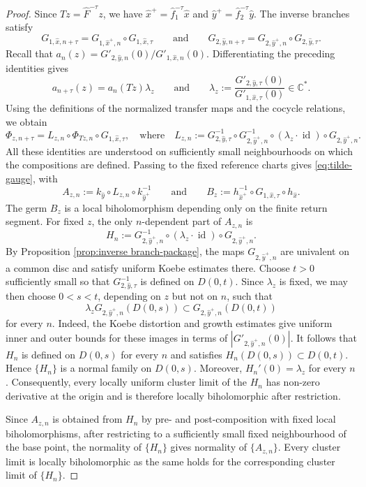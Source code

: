 \documentclass[11pt]{amsart}
\numberwithin{equation}{section}
\theoremstyle{plain}
\theoremstyle{definition}
\theoremstyle{remark}
\begin{document}
\begin{proof}
Since $Tz=\hat F^{-\tau}z$, we have
$\hat x^+=\hat f_1^{-\tau}\hat x$ and
$\hat y^+=\hat f_2^{-\tau}\hat y$. The inverse branches satisfy
$$
G_{1,\hat x,n+\tau}
=
G_{1,\hat x^+,n}\circ G_{1,\hat x,\tau}
\qquad
\text{and}
\qquad
G_{2,\hat y,n+\tau}
=
G_{2,\hat y^+,n}\circ G_{2,\hat y,\tau}.
$$
Recall that
$a_n(z)=G'_{2,\hat y,n}(0)/G'_{1,\hat x,n}(0)$. Differentiating the
preceding identities gives
$$
a_{n+\tau}(z)
=
a_n(Tz)\lambda_z
\qquad
\text{and}
\qquad
\lambda_z
:=
\frac{G'_{2,\hat y,\tau}(0)}
     {G'_{1,\hat x,\tau}(0)}
\in\mathbb C^*.
$$
Using the definitions of the normalized transfer maps and the cocycle
relations, we obtain
$$
\Phi_{z,n+\tau}
=
L_{z,n}\circ
\Phi_{Tz,n}\circ
G_{1,\hat x,\tau},
\quad \text{where}
\quad
L_{z,n}
:=
G_{2,\hat y,\tau}^{-1}
\circ
G_{2,\hat y^+,n}^{-1}
\circ
(\lambda_z\cdot\operatorname{id})
\circ
G_{2,\hat y^+,n}.
$$
All these identities are understood on sufficiently small
neighbourhoods on which the compositions are defined.
Passing to the fixed reference charts gives
\eqref{eq:tilde-gauge}, with
$$
A_{z,n}
:=
k_{\hat y}\circ L_{z,n}\circ k_{\hat y^+}^{-1}
\qquad
\text{and}
\qquad
B_z
:=
h_{\hat x^+}^{-1}\circ
G_{1,\hat x,\tau}\circ h_{\hat x}.
$$
The germ $B_z$ is a local biholomorphism depending only on the finite
return segment.
For fixed $z$, the only $n$-dependent part of $A_{z,n}$ is 
$$
H_n
:=
G_{2,\hat y^+,n}^{-1}
\circ
(\lambda_z\cdot\operatorname{id})
\circ
G_{2,\hat y^+,n}.
$$
By Proposition \ref{prop:inverse branch-package}, the maps
$G_{2,\hat y^+,n}$ are univalent on a common disc and satisfy uniform
Koebe estimates there. Choose $t>0$ sufficiently small so that
$G_{2,\hat y,\tau}^{-1}$ is defined on $D(0,t)$. Since $\lambda_z$
is fixed, we may then choose $0<s<t$, depending on $z$ but not on
$n$, such that
$$
\lambda_z G_{2,\hat y^+,n}(D(0,s))
\subset
G_{2,\hat y^+,n}(D(0,t))
$$
for every $n$. Indeed, the Koebe distortion and growth estimates give
uniform inner and outer bounds for these images in terms of
$|G'_{2,\hat y^+,n}(0)|$.
It follows that $H_n$ is defined on $D(0,s)$ for every $n$ and
satisfies
$H_n(D(0,s))\subset D(0,t)$.
Hence $\{H_n\}$ is a normal family on $D(0,s)$.
Moreover,
$H_n'(0)=\lambda_z$
for every $n$.
Consequently, every locally uniform cluster limit of the $H_n$ has
non-zero derivative at the origin and is therefore locally
biholomorphic after restriction.

Since $A_{z,n}$ is obtained from $H_n$ by pre- and
post-composition with fixed local biholomorphisms,
after restricting
to a sufficiently small fixed neighbourhood of the base point, the
normality of $\{H_n\}$ gives normality of
$\{A_{z,n}\}$. Every cluster limit is locally biholomorphic as
the same holds for the corresponding cluster limit of $\{H_n\}$.
\end{proof}
\end{document}
